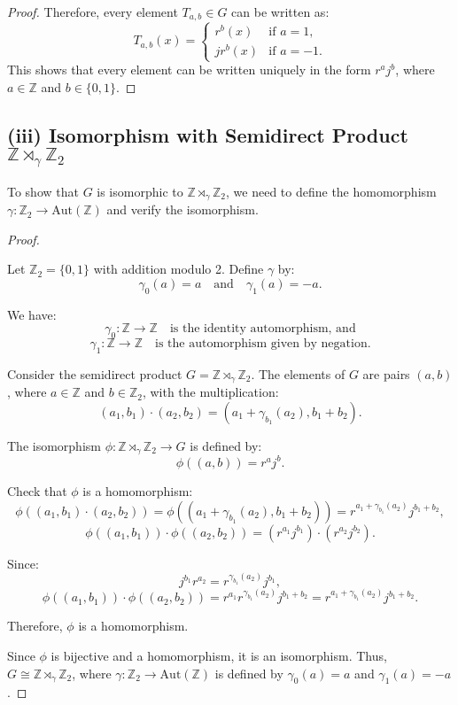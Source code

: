 \documentclass[12pt]{amsart}
\theoremstyle{definition}
\numberwithin{equation}{section}
\newcommand{\Z}{\mathbb{Z}}
\begin{document}
\begin{exercise}{6}
\begin{proof}
    Therefore, every element \(T_{a,b} \in G\) can be written as:
    \[
    T_{a,b}(x) = \begin{cases} r^b(x) & \text{if } a = 1, \\ jr^b(x) & \text{if } a = -1. \end{cases}
    \]
    This shows that every element can be written uniquely in the form \(r^a j^b\), where \(a \in \Z\) and \(b \in \{0,1\}\).
    
    \end{proof}

    \subsection*{(iii) Isomorphism with Semidirect Product \(\Z \rtimes_\gamma \Z_2\)}

    To show that \(G\) is isomorphic to \(\Z \rtimes_\gamma \Z_2\), we need to define the homomorphism \(\gamma: \Z_2 \rightarrow \text{Aut}(\Z)\) and verify the isomorphism.

    \begin{proof} \( \)
    
    Let \(\Z_2 = \{0, 1\}\) with addition modulo 2. Define \(\gamma\) by:
    \[
    \gamma_0(a) = a \quad \text{and} \quad \gamma_1(a) = -a.
    \]

    We have:
    \[
    \gamma_0: \Z \rightarrow \Z \quad \text{is the identity automorphism, and}
    \]
    \[
    \gamma_1: \Z \rightarrow \Z \quad \text{is the automorphism given by negation}.
    \]

    Consider the semidirect product \(G = \Z \rtimes_\gamma \Z_2\). The elements of \(G\) are pairs \((a,b)\), where \(a \in \Z\) and \(b \in \Z_2\), with the multiplication:
    \[
    (a_1, b_1) \cdot (a_2, b_2) = (a_1 + \gamma_{b_1}(a_2), b_1 + b_2).
    \]

    The isomorphism \(\phi: \Z \rtimes_\gamma \Z_2 \rightarrow G\) is defined by:
    \[
    \phi((a,b)) = r^a j^b.
    \]

    Check that \(\phi\) is a homomorphism:
    \[
    \phi((a_1, b_1) \cdot (a_2, b_2)) = \phi((a_1 + \gamma_{b_1}(a_2), b_1 + b_2)) = r^{a_1 + \gamma_{b_1}(a_2)} j^{b_1 + b_2},
    \]
    \[
    \phi((a_1, b_1)) \cdot \phi((a_2, b_2)) = (r^{a_1} j^{b_1}) \cdot (r^{a_2} j^{b_2}).
    \]

    Since:
    \[
    j^{b_1} r^{a_2} = r^{\gamma_{b_1}(a_2)} j^{b_1},
    \]
    \[
    \phi((a_1, b_1)) \cdot \phi((a_2, b_2)) = r^{a_1} r^{\gamma_{b_1}(a_2)} j^{b_1 + b_2} = r^{a_1 + \gamma_{b_1}(a_2)} j^{b_1 + b_2}.
    \]

    Therefore, \(\phi\) is a homomorphism.

    Since \(\phi\) is bijective and a homomorphism, it is an isomorphism. Thus, \(G \cong \Z \rtimes_\gamma \Z_2\), where \(\gamma: \Z_2 \rightarrow \text{Aut}(\Z)\) is defined by \(\gamma_0(a) = a\) and \(\gamma_1(a) = -a\).

    \end{proof}
    
    
\end{exercise}
\newpage
\end{document}
